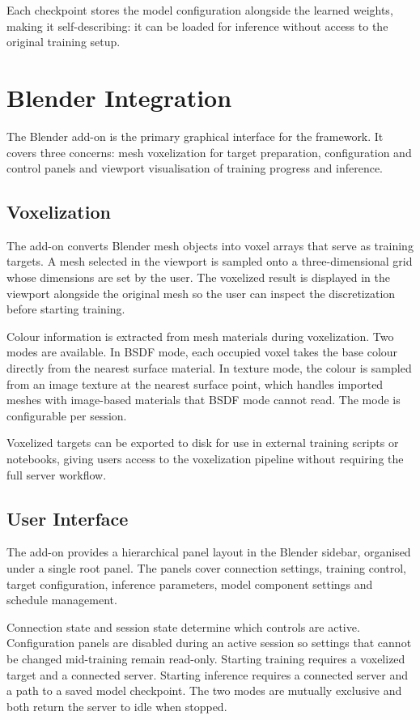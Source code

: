 Each checkpoint stores the model configuration alongside the learned weights,
making it self-describing: it can be loaded for inference without access to the
original training setup.

\section{Blender Integration}
\label{sec:arch-blender}

The Blender add-on is the primary graphical interface for the framework. It
covers three concerns: mesh voxelization for target preparation, configuration
and control panels and viewport visualisation of training progress and
inference.

\subsection{Voxelization}

The add-on converts Blender mesh objects into voxel arrays that serve as
training targets. A mesh selected in the viewport is sampled onto a
three-dimensional grid whose dimensions are set by the user. The voxelized
result is displayed in the viewport alongside the original mesh so the user can
inspect the discretization before starting training.

Colour information is extracted from mesh materials during voxelization. Two
modes are available. In BSDF mode, each occupied voxel takes the base colour
directly from the nearest surface material. In texture mode, the colour is
sampled from an image texture at the nearest surface point, which handles
imported meshes with image-based materials that BSDF mode cannot read. The
mode is configurable per session.

Voxelized targets can be exported to disk for use in external training scripts
or notebooks, giving users access to the voxelization pipeline without
requiring the full server workflow.

\subsection{User Interface}

The add-on provides a hierarchical panel layout in the Blender sidebar,
organised under a single root panel. The panels cover connection settings,
training control, target configuration, inference parameters, model component
settings and schedule management.

Connection state and session state determine which controls are active.
Configuration panels are disabled during an active session so settings that
cannot be changed mid-training remain read-only. Starting training requires a
voxelized target and a connected server. Starting inference requires a
connected server and a path to a saved model checkpoint. The two modes are
mutually exclusive and both return the server to idle when stopped.

